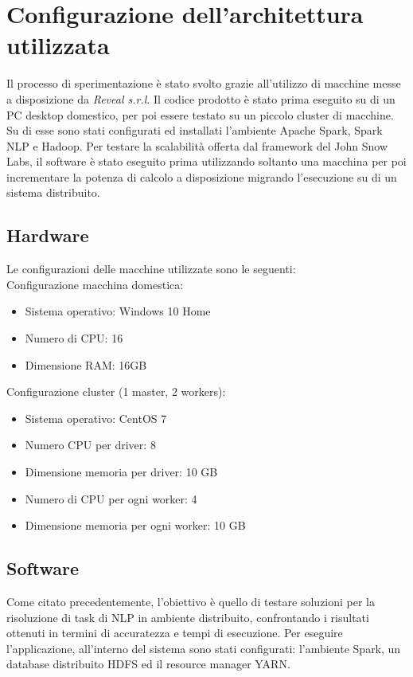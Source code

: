 \section{Configurazione dell’architettura utilizzata}
Il processo di sperimentazione è stato svolto grazie all'utilizzo di macchine messe a disposizione da \textit{Reveal s.r.l}.
Il codice prodotto è stato prima eseguito su di un PC desktop domestico, per poi essere testato su un piccolo cluster di \clustersize{} macchine. Su di esse sono stati configurati ed installati l'ambiente Apache Spark, Spark NLP e Hadoop. Per testare la scalabilità offerta dal framework del John Snow Labs, il software è stato eseguito prima utilizzando soltanto una macchina per poi incrementare la potenza di calcolo a disposizione migrando l'esecuzione su di un sistema distribuito. 

\subsection{Hardware}
Le configurazioni delle macchine utilizzate sono le seguenti:\\
Configurazione macchina domestica:
\begin{itemize}
    \item Sistema operativo: Windows 10 Home
    \item Numero di CPU: 16
    \item Dimensione RAM: 16GB
\end{itemize}
Configurazione cluster (1 master, 2 workers):
\begin{itemize}
    \item Sistema operativo: CentOS 7
    \item Numero CPU per driver: 8
    \item Dimensione memoria per driver: 10 GB
    \item Numero di CPU per ogni worker: 4
    \item Dimensione memoria per ogni worker: 10 GB
\end{itemize}

\subsection{Software}
Come citato precedentemente, l'obiettivo è quello di testare soluzioni per la risoluzione di task di NLP in ambiente distribuito, confrontando i risultati ottenuti in termini di accuratezza e tempi di esecuzione. Per eseguire l'applicazione, all'interno del sistema sono stati configurati: l'ambiente Spark, un database distribuito HDFS ed il resource manager YARN. 

